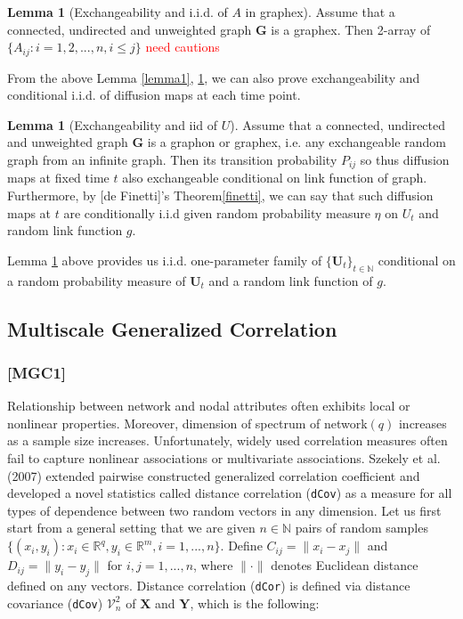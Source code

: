 \documentclass[12pt]{article}
\theoremstyle{definition}
\newtheorem{lemma}[theorem]{Lemma}
\begin{document}
\begin{lemma}[Exchangeability and i.i.d. of $A$ in graphex]
	\label{lemma2}
	Assume that a connected, undirected and unweighted graph $\mathbf{G}$ is a graphex. Then 2-array of $\{ A_{ij} : i = 1,2,... ,n , i \leq j \}$ \textcolor{red}{need cautions}
\end{lemma}


From the above Lemma \ref{lemma1}, \ref{lemma2}, we can also prove exchangeability and conditional i.i.d. of diffusion maps at each time point. 

\begin{lemma}[Exchangeability and iid of $U$]
	\label{lemma3}
Assume that a connected, undirected and unweighted graph $\mathbf{G}$ is a graphon or graphex, i.e. any exchangeable random graph from an infinite graph. Then its transition probability $P_{ij}$ so thus  diffusion maps at fixed time $t$ also exchangeable conditional on link function of graph. Furthermore, by [de Finetti]'s Theorem\ref{finetti}, we can say that such diffusion maps at $t$ are conditionally i.i.d given random probability measure $\eta$ on $U_{t}$ and random link function $g$.    
\end{lemma}


Lemma \ref{lemma3} above provides us i.i.d. one-parameter family of $\{ \mathbf{U}_{t} \}_{t \in \mathbb{N}}$ conditional on a random probability measure of $\mathbf{U}_{t}$ and a random link function of $g$.


\newpage
\subsection{Multiscale Generalized Correlation}

\subsubsection{[MGC1]}


Relationship between network and nodal attributes often exhibits local or nonlinear properties. Moreover, dimension of spectrum of network$(q)$ increases as a sample size increases. Unfortunately, widely used correlation measures often fail to capture nonlinear associations or multivariate associations. Szekely et al. (2007)\cite{Szekely2007} extended pairwise constructed generalized correlation coefficient and developed a novel statistics called distance correlation (\texttt{dCov}) as a measure for all types of dependence between two random vectors in any dimension. Let us first start from a general setting that we are given $n \in \mathbb{N}$ pairs of random samples $\{ (x_{i}, y_{i}) : x_{i} \in \mathbb{R}^{q}, y_{i} \in \mathbb{R}^{m}, i = 1,...,n \}$. Define $C_{ij} = \parallel x_{i} - x_{j} \parallel$ and $D_{ij} = \parallel y_{i} - y_{j} \parallel$ for $i,j=1,...,n$, where $\parallel \cdot \parallel$ denotes Euclidean distance defined on any vectors.   
Distance correlation (\texttt{dCor}) is defined via distance covariance (\texttt{dCov}) $\mathcal{V}^2_{n}$ of $\boldsymbol{X}$ and $\boldsymbol{Y}$, which is the following: 
\end{document}
